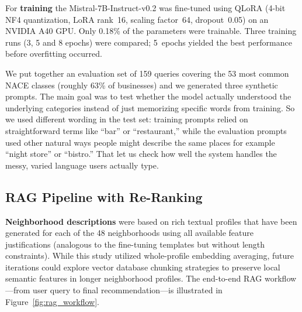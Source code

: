 \documentclass[pdflatex,sn-mathphys-num]{sn-jnl}%
\theoremstyle{thmstyleone}%
\theoremstyle{thmstyletwo}%
\theoremstyle{thmstylethree}%
\begin{document}
For \textbf{training} the Mistral-7B-Instruct-v0.2 was fine-tuned using QLoRA (4-bit NF4 quantization, LoRA rank~16, scaling factor~64, dropout~0.05) on an NVIDIA A40 GPU. Only 0.18\% of the parameters were trainable. Three training runs (3, 5 and 8 epochs) were compared; 5~epochs yielded the best performance before overfitting occurred.


We put together an evaluation set of 159 queries covering the 53 most common NACE classes (roughly 63\% of businesses) and we generated three synthetic prompts. The main goal was to test whether the model actually understood the underlying categories instead of just memorizing specific words from training. So we used different wording in the test set: training prompts relied on straightforward terms like “bar” or “restaurant,” while the evaluation prompts used other natural ways people might describe the same places for example “night store” or “bistro.” That let us check how well the system handles the messy, varied language users actually type.



\subsection{RAG Pipeline with Re-Ranking}

\textbf{Neighborhood descriptions} were based on rich textual profiles that have been generated for each of the 48 neighborhoods using all available feature justifications (analogous to the fine-tuning templates but without length constraints). While this study utilized whole-profile embedding averaging, future iterations could explore vector database chunking strategies to preserve local semantic features in longer neighborhood profiles. The end-to-end RAG workflow---from user query to final recommendation---is illustrated in Figure~\ref{fig:rag_workflow}.
\end{document}
